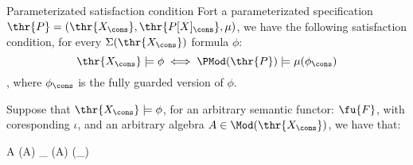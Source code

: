 
\begin{proposition}{Parameterizated satisfaction condition}
\label{prop:parasat}
Fort a parameterizated specification
	$\thr{P}=(\thr{X_\cons}, \thr{P[X]_\cons}, \mu)$, we have the following
	satisfaction condition, for every $\Sigma(\thr{X_\cons})$ formula $\phi$:
	\[ \thr{X_\cons} \models \phi \iff \PMod(\thr{P}) \models \mu(\phi_\cons) \]
, where $\phi_\cons$ is the fully guarded version of $\phi$.
\end{proposition}

\begin{PROOF}
Suppose that $\thr{X_\cons} \models \phi$, for an arbitrary semantic functor: $\fu{F}$, with coresponding $\iota$, and an arbitrary algebra $A \in \Mod(\thr{X_\cons})$, we have that: 
	\begin{eqp}
		A \models \phi 
		\iota(A) \models \phi_\cons
		(A) \models \mu(\phi_\cons)
	\end{eqp}
\end{PROOF}




